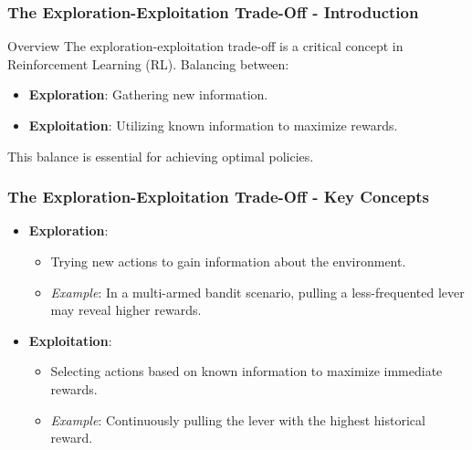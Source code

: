 \documentclass[aspectratio=169]{beamer}
\begin{document}
\begin{frame}[fragile]
    \frametitle{The Exploration-Exploitation Trade-Off - Introduction}
    \begin{block}{Overview}
        The exploration-exploitation trade-off is a critical concept in Reinforcement Learning (RL).
        Balancing between:
        \begin{itemize}
            \item \textbf{Exploration}: Gathering new information.
            \item \textbf{Exploitation}: Utilizing known information to maximize rewards.
        \end{itemize}
        This balance is essential for achieving optimal policies.
    \end{block}
\end{frame}

\begin{frame}[fragile]
    \frametitle{The Exploration-Exploitation Trade-Off - Key Concepts}
    \begin{itemize}
        \item \textbf{Exploration}:
        \begin{itemize}
            \item Trying new actions to gain information about the environment.
            \item \textit{Example}: In a multi-armed bandit scenario, pulling a less-frequented lever may reveal higher rewards.
        \end{itemize}
        
        \item \textbf{Exploitation}:
        \begin{itemize}
            \item Selecting actions based on known information to maximize immediate rewards.
            \item \textit{Example}: Continuously pulling the lever with the highest historical reward.
        \end{itemize}
    \end{itemize}
\end{frame}
\end{document}
